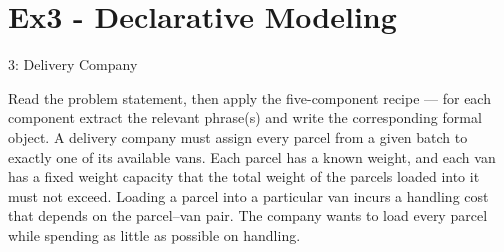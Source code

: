 \documentclass[fleqn,11pt,aspectratio=169]{beamer}
\begin{document}
\section{Ex3 - Declarative Modeling}

\begin{frame}[t]{3: Delivery Company}
	\begin{block}{Read the problem statement, then apply the five-component recipe — for each component extract the relevant phrase(s) and write the corresponding formal object.}
		A delivery company must assign every parcel from a given batch to exactly one of its available vans. Each parcel has a known weight, and each van has a fixed weight capacity that the total weight of the parcels loaded into it must not exceed. Loading a parcel into a particular van incurs a handling cost that depends on the parcel–van pair. The company wants to load every parcel while spending as little as possible on handling.
	\end{block}
\end{frame}
\end{document}
